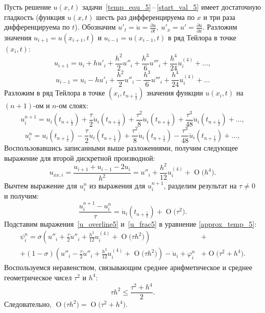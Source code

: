 \documentclass[11pt,a4paper,twoside,listtotoc,bibtotoc]{report}
\numberwithin{equation}{section}
\theoremstyle{definition}
\theoremstyle{plain}
\newcommand{\bigO}[1]{\ensuremath{\operatorname{O}\bigl(#1\bigr)}}
\begin{document}
Пусть решение
$u(x, t)$ задачи~\eqref{temp_equ_5}\,--\,\eqref{start_val_5} имеет
достаточную гладкость (функция $u(x, t)$ шесть раз дифференцируема по $x$ и три раза
дифференцируема по $t$). Обозначим $u'_t = \dot u = \frac{\partial u}{\partial t},
~u'_x = u' = \frac{\partial u}{\partial x}$. Разложим значения
$u_{i+1} = u(x_{i+1},t)$ и $u_{i-1} = u(x_{i-1},t)$ в ряд
Тейлора в точке $(x_i, t)$:
%
$$
    u_{i+1} = u_i + hu'_i + \frac{h^2}{2}u''_i + \frac{h^3}{6}u'''_i +
    \frac{h^4}{24}u^{(4)}_i + \ldots,
$$
%
$$
    u_{i-1} = u_i - hu'_i + \frac{h^2}{2}u''_i - \frac{h^3}{6}u'''_i +
    \frac{h^4}{24}u^{(4)}_i + \ldots
$$
%
Разложим в ряд Тейлора в точке $(x_i, t_{n + \frac12})$ значения
функции $u(x_i,t)$ на $(n+1)$-ом и $n$-ом слоях:
%
$$
    u_i^{n+1} = u_i(t_{n+\frac12}) +
    \frac{\tau}{2}\dot{u}_i(t_{n+\frac12}) +
    \frac{\tau^2}{8}\ddot{u}_i(t_{n+\frac12}) +
    \frac{\tau^3}{48}\dddot{u}_i(t_{n+\frac12}) + \ldots,
$$
%
$$
    u_i^{n} = u_i(t_{n+\frac12}) -
    \frac{\tau}{2}\dot{u}_i(t_{n+\frac12}) +
    \frac{\tau^2}{8}\ddot{u}_i(t_{n+\frac12}) -
    \frac{\tau^3}{48}\dddot{u}_i(t_{n+\frac12}) + \ldots,
$$
%
Воспользовавшись записанными выше разложениями, получим следующее выражение для
второй дискретной производной:
%
\begin{equation}
%
    \label{u_overline5}
    u_{\overline{x}x,i} = \frac{u_{i+1} + u_{i-1} - 2u_i}{h^2} =
        u''_i + \dfrac{h^2}{12} u^{(4)}_i + \bigO{h^4}.
%
\end{equation}
%
Вычтем выражение для $u_i^{n}$ из выражения для $u_i^{n+1}$,
разделим результат на $\tau\neq0$ и получим:
%
\begin{equation}
%
    \label{u_frac5}
    \frac{u_i^{n+1} - u_i^n}{\tau} = \dot{u}_i(t_{n+\frac12}) + \bigO{\tau^2}.
%
\end{equation}
%
Подставим выражения~\eqref{u_overline5} и~\eqref{u_frac5} в уравнение
\eqref{approx_temp_5}:
%
\begin{equation}
%
    \label{psi_with_O1}
    \begin{split}
        \psi_i^n = \sigma\left(u''_i + \frac{\tau}{2}\dot{u}''_i +
        \frac{h^2}{12}u_i^{(4)} + \bigO{\tau h^2}\right) &+ \\
        + (1 - \sigma)\left(u''_i - \frac{\tau}{2}\dot{u}''_i +
        \frac{h^2}{12} u_i^{(4)} + \bigO{\tau h^2}\right) -
        \dot{u}_i + \varphi_i^n &+ \bigO{\tau^2 + h^4}.
    \end{split}
%
\end{equation}
%
Воспользуемся неравенством, связывающим среднее арифметическое и среднее геометрическое
чисел $\tau^2$ и $h^4$:
%
$$
    \tau h^2 \leqslant \frac{\tau^2 + h^4}{2}.
$$
%
Следовательно, $\bigO{\tau h^2} = \bigO{\tau^2 + h^4}$.
\end{document}
